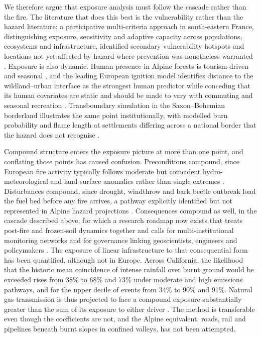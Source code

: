 \documentclass[11pt,a4paper]{article}
\begin{document}
We therefore argue that exposure analysis must follow the cascade rather than the fire. The literature that does this best is the vulnerability rather than the hazard literature: a participative multi-criteria approach in south-eastern France, distinguishing exposure, sensitivity and adaptive capacity across populations, ecosystems and infrastructure, identified secondary vulnerability hotspots and locations not yet affected by hazard where prevention was nonetheless warranted \citep{riviere_mapping_2023}. Exposure is also dynamic. Human presence in Alpine forests is tourism-driven and seasonal \citep{pede_mountain_2022, abrham_wildfires_2024}, and the leading European ignition model identifies distance to the wildland--urban interface as the strongest human predictor while conceding that its human covariates are static and should be made to vary with commuting and seasonal recreation \citep{gelabert_assessing_2025}. Transboundary simulation in the Saxon--Bohemian borderland illustrates the same point institutionally, with modelled burn probability and flame length at settlements differing across a national border that the hazard does not recognise \citep{avouris_exposure_2025}.

Compound structure enters the exposure picture at more than one point, and conflating those points has caused confusion. Preconditions compound, since European fire activity typically follows moderate but coincident hydro-meteorological and land-surface anomalies rather than single extremes \citep{miller_compounding_2025}. Disturbances compound, since drought, windthrow and bark beetle outbreak load the fuel bed before any fire arrives, a pathway explicitly identified but not represented in Alpine hazard projections \citep{gerberding_mapping_2025, bebi_changes_2017}. Consequences compound as well, in the cascade described above, for which a research roadmap now exists that treats post-fire and frozen-soil dynamics together and calls for multi-institutional monitoring networks and for governance linking geoscientists, engineers and policymakers \citep{baselt_compound_2026}. The exposure of linear infrastructure to that consequential form has been quantified, although not in Europe. Across California, the likelihood that the historic mean coincidence of intense rainfall over burnt ground would be exceeded rises from 38\% to 68\% and 73\% under moderate and high emissions pathways, and for the upper decile of events from 34\% to 90\% and 91\%. Natural gas transmission is thus projected to face a compound exposure substantially greater than the sum of its exposure to either driver \citep{moftakhari_increasing_2019}. The method is transferable even though the coefficients are not, and the Alpine equivalent, roads, rail and pipelines beneath burnt slopes in confined valleys, has not been attempted.
\end{document}
